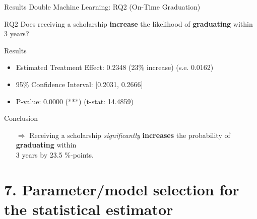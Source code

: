 \documentclass[aspectratio=169]{beamer}
\begin{document}
\begin{frame}{Results Double Machine Learning: RQ2 (On-Time Graduation)}
\vspace{20pt}
\begin{alertblock}{RQ2}
	Does receiving a scholarship \textbf{increase} the likelihood of \textbf{graduating} within 3 years?
\end{alertblock}

\begin{block}{Results}
\begin{itemize}[label=--,itemsep=1pt,topsep=2pt]
	\item Estimated Treatment Effect: 0.2348 (23\% increase) (s.e. 0.0162)
	\item 95\% Confidence Interval: [0.2031, 0.2666]
	\item P-value: 0.0000 (***) (t-stat: 14.4859)
\end{itemize}
\end{block}

\begin{exampleblock}{Conclusion}
\vspace{-3pt}
\begin{itemize}
	\item [$\Rightarrow$]Receiving a scholarship \textit{significantly} \textbf{increases} the probability of \textbf{graduating} within \\ 3 years by 23.5 \%-points.
\end{itemize}
\vspace{-3pt}
	
\end{exampleblock}

\end{frame}




\section{7. Parameter/model selection for the statistical estimator}
\end{document}
